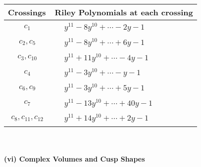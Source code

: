 \documentclass[1p]{elsarticle_modified}
\theoremstyle{definition}
\begin{document}
\begin{tabular}{m{50pt}|m{274pt}}
Crossings & \hspace{64pt}Riley Polynomials at each crossing \\
\hline $$\begin{aligned}c_{1}\end{aligned}$$&$\begin{aligned}
&y^{11}-8 y^{10}+\cdots-2 y-1
\end{aligned}$\\
\hline $$\begin{aligned}c_{2},c_{5}\end{aligned}$$&$\begin{aligned}
&y^{11}-8 y^{10}+\cdots+6 y-1
\end{aligned}$\\
\hline $$\begin{aligned}c_{3},c_{10}\end{aligned}$$&$\begin{aligned}
&y^{11}+11 y^{10}+\cdots-4 y-1
\end{aligned}$\\
\hline $$\begin{aligned}c_{4}\end{aligned}$$&$\begin{aligned}
&y^{11}-3 y^{10}+\cdots- y-1
\end{aligned}$\\
\hline $$\begin{aligned}c_{6},c_{9}\end{aligned}$$&$\begin{aligned}
&y^{11}-3 y^{10}+\cdots+5 y-1
\end{aligned}$\\
\hline $$\begin{aligned}c_{7}\end{aligned}$$&$\begin{aligned}
&y^{11}-13 y^{10}+\cdots+40 y-1
\end{aligned}$\\
\hline $$\begin{aligned}c_{8},c_{11},c_{12}\end{aligned}$$&$\begin{aligned}
&y^{11}+14 y^{10}+\cdots+2 y-1
\end{aligned}$\\
\hline
\end{tabular}\\~\\
\newpage\flushleft \textbf{(vi) Complex Volumes and Cusp Shapes}
\end{document}
